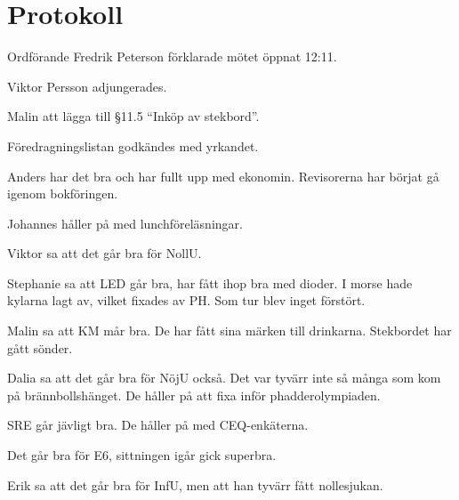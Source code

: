 \documentclass[10pt]{article}
\def\mo{Fredrik Peterson}
\begin{document}
\section*{Protokoll}
\begin{paragrafer}
Ordförande {\mo} förklarade mötet öppnat 12:11.

\valavmo

\valavms

\tosg

Viktor Persson adjungerades.

\valavj

Malin \ypa att lägga till \S11.5 ``Inköp av stekbord''.

Föredragningslistan godkändes med yrkandet.

\ingaprot

\begin{fyllnadsval}
\end{fyllnadsval} %

\begin{paragrafer}
Anders har det bra och har fullt upp med ekonomin. Revisorerna har börjat gå igenom bokföringen.

Johannes håller på med lunchföreläsningar.

Viktor sa att det går bra för NollU.

Stephanie sa att LED går bra, har fått ihop bra med dioder. I morse hade kylarna lagt av, vilket fixades av PH. Som tur blev inget förstört.

Malin sa att KM mår bra. De har fått sina märken till drinkarna. Stekbordet har gått sönder.

Dalia sa att det går bra för NöjU också. Det var tyvärr inte så många som kom på brännbollshänget. De håller på att fixa inför phadderolympiaden.

SRE går jävligt bra. De håller på med CEQ-enkäterna.

Det går bra för E6, sittningen igår gick superbra.

Erik sa att det går bra för InfU, men att han tyvärr fått nollesjukan.


\end{paragrafer}
\end{paragrafer}
\end{document}

